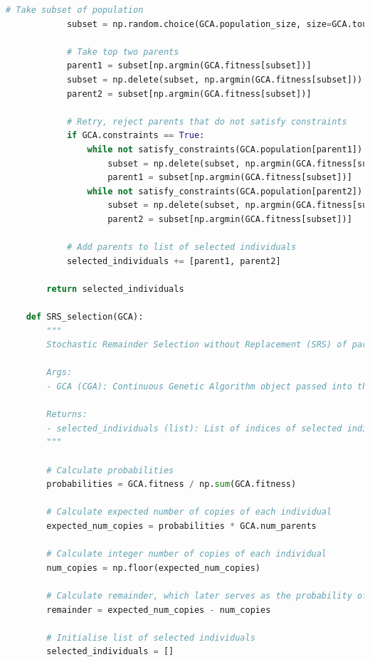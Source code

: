 \documentclass[10pt]{article}
\begin{document}
\begin{lstlisting}[language=Python, caption=selection\_functions.py, label=selection_functionspy]
            # Take subset of population
            subset = np.random.choice(GCA.population_size, size=GCA.tournament_size, replace=False)
    
            # Take top two parents
            parent1 = subset[np.argmin(GCA.fitness[subset])]
            subset = np.delete(subset, np.argmin(GCA.fitness[subset]))
            parent2 = subset[np.argmin(GCA.fitness[subset])]
    
            # Retry, reject parents that do not satisfy constraints
            if GCA.constraints == True:
                while not satisfy_constraints(GCA.population[parent1]):
                    subset = np.delete(subset, np.argmin(GCA.fitness[subset]))
                    parent1 = subset[np.argmin(GCA.fitness[subset])]
                while not satisfy_constraints(GCA.population[parent2]):
                    subset = np.delete(subset, np.argmin(GCA.fitness[subset]))
                    parent2 = subset[np.argmin(GCA.fitness[subset])]
    
            # Add parents to list of selected individuals
            selected_individuals += [parent1, parent2]
    
        return selected_individuals
    
    def SRS_selection(GCA):
        """
        Stochastic Remainder Selection without Replacement (SRS) of parents. 
    
        Args:
        - GCA (CGA): Continuous Genetic Algorithm object passed into this function using self.select_parents(self)
    
        Returns:
        - selected_individuals (list): List of indices of selected individuals for mating, length = GCA.num_parents
        """
    
        # Calculate probabilities
        probabilities = GCA.fitness / np.sum(GCA.fitness)
    
        # Calculate expected number of copies of each individual
        expected_num_copies = probabilities * GCA.num_parents
    
        # Calculate integer number of copies of each individual
        num_copies = np.floor(expected_num_copies) 
    
        # Calculate remainder, which later serves as the probability of further selection
        remainder = expected_num_copies - num_copies
    
        # Initialise list of selected individuals
        selected_individuals = []
    

\end{lstlisting}
\end{document}
